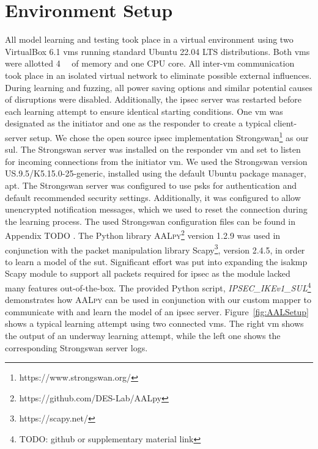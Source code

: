 \section{Environment Setup} \label{sec:env}
All model learning and testing took place in a virtual environment using two VirtualBox 6.1 \acp{vm} running standard Ubuntu 22.04 LTS distributions. Both \acp{vm} were allotted \SI{4}{\giga\byte} of memory and one CPU core. All inter-\ac{vm} communication took place in an isolated virtual network to eliminate possible external influences. During learning and fuzzing, all power saving options and similar potential causes of disruptions were disabled. Additionally, the \ac{ipsec} server was restarted before each learning attempt to ensure identical starting conditions. One \ac{vm} was designated as the initiator and one as the responder to create a typical client-server setup. We chose the open source \ac{ipsec} implementation Strongswan\footnote{https://www.strongswan.org/} as our \ac{sul}. The Strongswan server was installed on the responder \ac{vm} and set to listen for incoming connections from the initiator \ac{vm}. We used the Strongswan version US.9.5/K5.15.0-25-generic, installed using the default Ubuntu package manager, apt. The Strongswan server was configured to use \acp{psk} for authentication and default recommended security settings. Additionally, it was configured to allow unencrypted notification messages, which we used to reset the connection during the learning process. The used Strongswan configuration files can be found in Appendix TODO . The Python library \textsc{AALpy}\footnote{https://github.com/DES-Lab/AALpy} version 1.2.9 was used in conjunction with the packet manipulation library Scapy\footnote{https://scapy.net/}, version 2.4.5, in order to learn a model of the \ac{sut}. Significant effort was put into expanding the \ac{isakmp} Scapy module to support all packets required for \ac{ipsec} as the module lacked many features out-of-the-box. The provided Python script, \emph{IPSEC\_IKEv1\_SUL}\footnote{TODO: github or supplementary material link} demonstrates how \textsc{AALpy} can be used in conjunction with our custom mapper to communicate with and learn the model of an \ac{ipsec} server. Figure~\ref{fig:AALSetup} shows a typical learning attempt using two connected \acp{vm}. The right \ac{vm} shows the output of an underway learning attempt, while the left one shows the corresponding Strongswan server logs.

